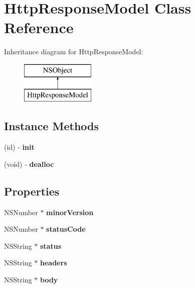 \hypertarget{interface_http_response_model}{}\section{Http\+Response\+Model Class Reference}
\label{interface_http_response_model}
Inheritance diagram for Http\+Response\+Model\+:\begin{figure}[H]
\begin{center}
\leavevmode
\includegraphics[height=2.000000cm]{interface_http_response_model}
\end{center}
\end{figure}
\subsection*{Instance Methods}
\begin{DoxyCompactItemize}
\item 
\mbox{\label{interface_http_response_model_a1a6f6c00d479c20577c40bdb0c216cd3}} 
(id) -\/ {\bfseries init}
\item 
\mbox{\label{interface_http_response_model_a3b049ae6a70dce98f47c8662639a4048}} 
(void) -\/ {\bfseries dealloc}
\end{DoxyCompactItemize}
\subsection*{Properties}
\begin{DoxyCompactItemize}
\item 
\mbox{\label{interface_http_response_model_adea16f6b694f3a367a9092e6aad5d715}} 
N\+S\+Number $\ast$ {\bfseries minor\+Version}
\item 
\mbox{\label{interface_http_response_model_ac7afa813b63b28639461532b5e374caf}} 
N\+S\+Number $\ast$ {\bfseries status\+Code}
\item 
\mbox{\label{interface_http_response_model_a79213ed7274523c0377c136e726f1536}} 
N\+S\+String $\ast$ {\bfseries status}
\item 
\mbox{\label{interface_http_response_model_a14f455063378dcf126ae1be299634e90}} 
N\+S\+String $\ast$ {\bfseries headers}
\item 
\mbox{\label{interface_http_response_model_ad30b96c99f691733c69a13fa01dd06d3}} 
N\+S\+String $\ast$ {\bfseries body}
\end{DoxyCompactItemize}


